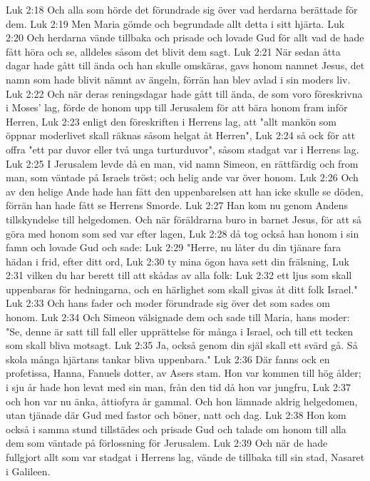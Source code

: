 Luk 2:18  Och alla som hörde det förundrade sig över vad herdarna berättade för dem.
Luk 2:19  Men Maria gömde och begrundade allt detta i sitt hjärta.
Luk 2:20  Och herdarna vände tillbaka och prisade och lovade Gud för allt vad de hade fått höra och se, alldeles såsom det blivit dem sagt.
Luk 2:21  När sedan åtta dagar hade gått till ända och han skulle omskäras, gavs honom namnet Jesus, det namn som hade blivit nämnt av ängeln, förrän han blev avlad i sin moders liv.
Luk 2:22  Och när deras reningsdagar hade gått till ända, de som voro föreskrivna i Moses' lag, förde de honom upp till Jerusalem för att bära honom fram inför Herren,
Luk 2:23  enligt den föreskriften i Herrens lag, att "allt mankön som öppnar moderlivet skall räknas såsom helgat åt Herren",
Luk 2:24  så ock för att offra "ett par duvor eller två unga turturduvor", såsom stadgat var i Herrens lag.
Luk 2:25  I Jerusalem levde då en man, vid namn Simeon, en rättfärdig och from man, som väntade på Israels tröst; och helig ande var över honom.
Luk 2:26  Och av den helige Ande hade han fått den uppenbarelsen att han icke skulle se döden, förrän han hade fått se Herrens Smorde.
Luk 2:27  Han kom nu genom Andens tillskyndelse till helgedomen. Och när föräldrarna buro in barnet Jesus, för att så göra med honom som sed var efter lagen,
Luk 2:28  då tog också han honom i sin famn och lovade Gud och sade:
Luk 2:29  "Herre, nu låter du din tjänare fara hädan i frid, efter ditt ord,
Luk 2:30  ty mina ögon hava sett din frälsning,
Luk 2:31  vilken du har berett till att skådas av alla folk:
Luk 2:32  ett ljus som skall uppenbaras för hedningarna, och en härlighet som skall givas åt ditt folk Israel."
Luk 2:33  Och hans fader och moder förundrade sig över det som sades om honom.
Luk 2:34  Och Simeon välsignade dem och sade till Maria, hans moder: "Se, denne är satt till fall eller upprättelse för många i Israel, och till ett tecken som skall bliva motsagt.
Luk 2:35  Ja, också genom din själ skall ett svärd gå. Så skola många hjärtans tankar bliva uppenbara."
Luk 2:36  Där fanns ock en profetissa, Hanna, Fanuels dotter, av Asers stam. Hon var kommen till hög ålder; i sju år hade hon levat med sin man, från den tid då hon var jungfru,
Luk 2:37  och hon var nu änka, åttiofyra år gammal. Och hon lämnade aldrig helgedomen, utan tjänade där Gud med fastor och böner, natt och dag.
Luk 2:38  Hon kom också i samma stund tillstädes och prisade Gud och talade om honom till alla dem som väntade på förlossning för Jerusalem.
Luk 2:39  Och när de hade fullgjort allt som var stadgat i Herrens lag, vände de tillbaka till sin stad, Nasaret i Galileen.
